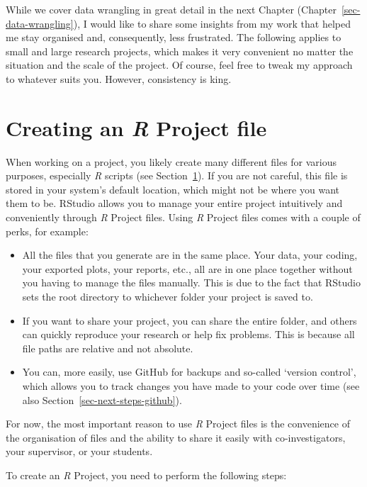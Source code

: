 \documentclass[
  letterpaper,
]{krantz}
\begin{document}
While we cover data wrangling in great detail in the next Chapter
(Chapter~\ref{sec-data-wrangling}), I would like to share some insights
from my work that helped me stay organised and, consequently, less
frustrated. The following applies to small and large research projects,
which makes it very convenient no matter the situation and the scale of
the project. Of course, feel free to tweak my approach to whatever suits
you. However, consistency is king.

\section{\texorpdfstring{Creating an \emph{R} Project
file}{Creating an R Project file}}\label{sec-creating-an-r-project}

When working on a project, you likely create many different files for
various purposes, especially \emph{R} scripts (see
Section~\ref{sec-creating-an-r-project}). If you are not careful, this
file is stored in your system's default location, which might not be
where you want them to be. RStudio allows you to manage your entire
project intuitively and conveniently through \emph{R} Project files.
Using \emph{R} Project files comes with a couple of perks, for example:

\begin{itemize}
\item
  All the files that you generate are in the same place. Your data, your
  coding, your exported plots, your reports, etc., all are in one place
  together without you having to manage the files manually. This is due
  to the fact that RStudio sets the root directory to whichever folder
  your project is saved to.
\item
  If you want to share your project, you can share the entire folder,
  and others can quickly reproduce your research or help fix problems.
  This is because all file paths are relative and not absolute.
\item
  You can, more easily, use GitHub for backups and so-called `version
  control', which allows you to track changes you have made to your code
  over time (see also Section~\ref{sec-next-steps-github}).
\end{itemize}

For now, the most important reason to use \emph{R} Project files is the
convenience of the organisation of files and the ability to share it
easily with co-investigators, your supervisor, or your students.

To create an \emph{R} Project, you need to perform the following steps:
\end{document}
